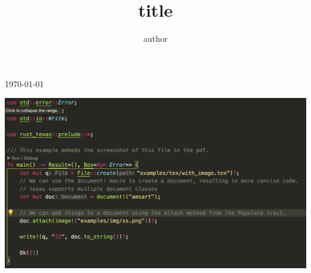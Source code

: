 \documentclass[]{amsart}
\begin{document}
\title{title}
\author{author}

\today
\maketitle



\includegraphics[]{examples/img/ss.png} 
\end{document}
